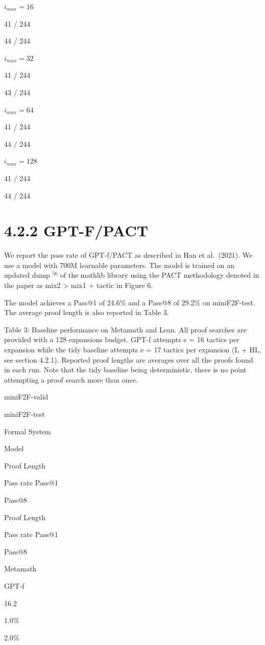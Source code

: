 \documentclass[
]{article}
\begin{document}
\(i_{max} = 16\)

41 / 244

44 / 244

\(i_{max} = 32\)

41 / 244

43 / 244

\(i_{max} = 64\)

41 / 244

44 / 244

\(i_{max} = 128\)

41 / 244

44 / 244

\section{4.2.2 GPT-F/PACT}\label{gpt-fpact}

We report the pass rate of GPT-f/PACT as described in Han et al.~(2021).
We use a model with 700M learnable parameters. The model is trained on
an updated dump \(^{56}\) of the mathlib library using the PACT
methodology denoted in the paper as mix2 \textgreater{} mix1 + tactic in
Figure 6.

The model achieves a Pass@1 of 24.6\% and a Pass@8 of 29.2\% on
miniF2F-test. The average proof length is also reported in Table 3.

Table 3: Baseline performance on Metamath and Lean. All proof searches
are provided with a 128 expansions budget. GPT-f attempts e = 16 tactics
per expansion while the tidy baseline attempts e = 17 tactics per
expansion (L + HL, see section 4.2.1). Reported proof lengths are
averages over all the proofs found in each run. Note that the tidy
baseline being deterministic, there is no point attempting a proof
search more than once.

miniF2F-valid

miniF2F-test

Formal System

Model

Proof Length

Pass rate Pass@1

Pass@8

Proof Length

Pass rate Pass@1

Pass@8

Metamath

GPT-f

16.2

1.0\%

2.0\%
\end{document}

